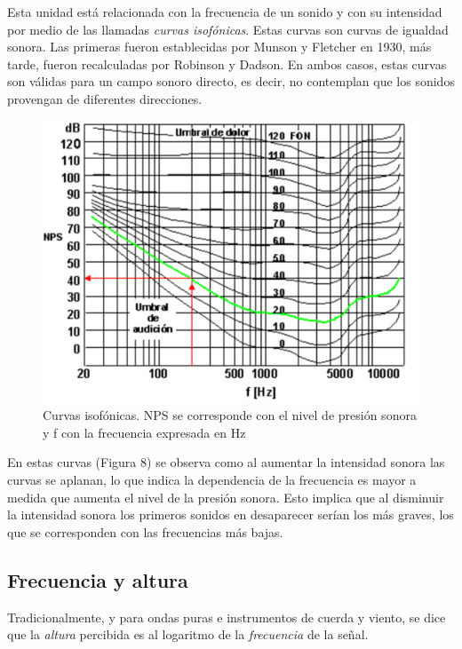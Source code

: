 \documentclass[11pt,a4paper]{article}
\begin{document}
	Esta unidad está relacionada con la frecuencia de un sonido y con su intensidad por medio de las llamadas \emph{curvas isofónicas}. Estas curvas son curvas de igualdad sonora. Las primeras fueron establecidas por Munson y Fletcher en 1930, más tarde, fueron recalculadas por Robinson y Dadson. En ambos casos, estas curvas son válidas para un campo sonoro directo, es decir, no contemplan que los sonidos provengan de diferentes direcciones.
	
	\begin{figure}[h]
		\centering
		\includegraphics[scale=.4]{CurvasIso}
		\caption{Curvas isofónicas. NPS se corresponde con el nivel de presión sonora y f con la frecuencia expresada en Hz}
	\end{figure}
	
	
	En estas curvas (Figura 8) se observa como al aumentar la intensidad sonora las curvas se aplanan, lo que indica la dependencia de la frecuencia es mayor a medida que aumenta el nivel de la presión sonora. Esto implica que al disminuir la intensidad sonora los primeros sonidos en desaparecer serían los más graves, los que se corresponden con las frecuencias más bajas.
	
	\subsection{Frecuencia y altura}
		
		Tradicionalmente, y para ondas puras e instrumentos de cuerda y viento, se dice que la \emph{altura} percibida es al logaritmo de la \emph{frecuencia} de la señal.
		
\end{document}
